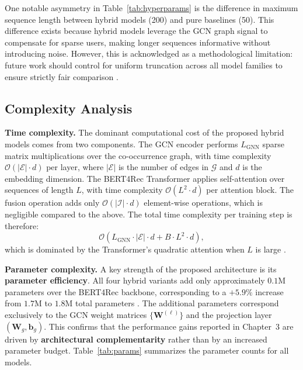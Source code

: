 \documentclass[12pt,a4paper]{report}
\newcommand{\parencite}[1]{\citep{#1}}
\begin{document}
\noindent One notable asymmetry in Table~\ref{tab:hyperparams}
is the difference in maximum sequence length between hybrid models
(200) and pure baselines (50). This difference exists because
hybrid models leverage the GCN graph signal to compensate for
sparse users, making longer sequences informative without
introducing noise. However, this is acknowledged as a
methodological limitation: future work should control for uniform
truncation across all model families to ensure strictly fair
comparison \parencite{ouledmeriem2025hybrid}.

\subsection{Complexity Analysis}

\textbf{Time complexity.} The dominant computational cost of the
proposed hybrid models comes from two components. The GCN encoder
performs $L_{\text{GNN}}$ sparse matrix multiplications over the
co-occurrence graph, with time complexity
$\mathcal{O}(|\mathcal{E}| \cdot d)$ per layer, where
$|\mathcal{E}|$ is the number of edges in $\mathcal{G}$ and $d$
is the embedding dimension. The BERT4Rec Transformer applies
self-attention over sequences of length $L$, with time complexity
$\mathcal{O}(L^2 \cdot d)$ per attention block. The fusion
operation adds only $\mathcal{O}(|\mathcal{I}| \cdot d)$
element-wise operations, which is negligible compared to the
above. The total time complexity per training step is therefore:
\begin{equation}
  \mathcal{O}\!\left(
    L_{\text{GNN}} \cdot |\mathcal{E}| \cdot d
    + B \cdot L^2 \cdot d
  \right),
\end{equation}
which is dominated by the Transformer's quadratic attention when
$L$ is large \parencite{ouledmeriem2025hybrid}.

\textbf{Parameter complexity.} A key strength of the proposed
architecture is its \textbf{parameter efficiency}. All four
hybrid variants add only approximately $0.1$M parameters over
the BERT4Rec backbone, corresponding to a $+5.9\%$ increase
from $1.7$M to $1.8$M total parameters
\parencite{ouledmeriem2025hybrid}. The additional parameters
correspond exclusively to the GCN weight matrices
$\{\mathbf{W}^{(\ell)}\}$ and the projection layer
$(\mathbf{W}_g, \mathbf{b}_g)$. This confirms that the
performance gains reported in Chapter~3 are driven by
\textbf{architectural complementarity} rather than by an
increased parameter budget. Table~\ref{tab:params} summarizes
the parameter counts for all models.
\end{document}
